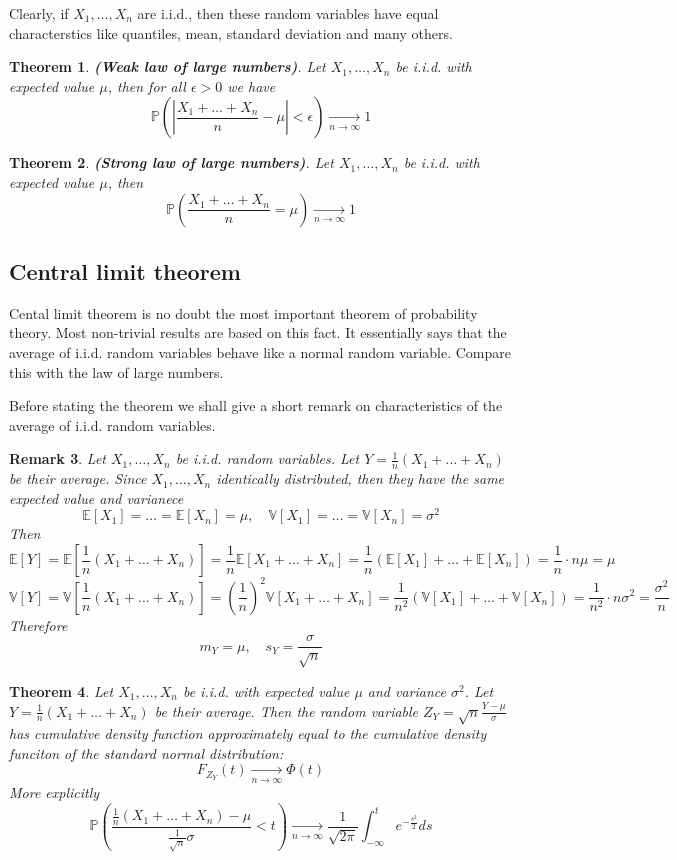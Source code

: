 \documentclass[12pt]{article}
\newtheorem{theorem}{Theorem}[subsection]
\newtheorem{remark}[theorem]{Remark}
\begin{document}
Clearly, if $X_1,\ldots,X_n$ are i.i.d., then these random variables have equal characterstics like quantiles, mean, standard deviation and many others.

\begin{theorem} \textbf{(Weak law of large numbers)}. Let $X_1,\ldots,X_n$ be i.i.d. with expected value $\mu$, then for all $\epsilon>0$ we have
$$
\mathbb{P}\left(\left|\frac{X_1+\ldots+X_n}{n}-\mu\right|<\epsilon\right)\underset{n\to\infty}{\to}1
$$
\end{theorem}

\begin{theorem} \textbf{(Strong law of large numbers)}. Let $X_1,\ldots,X_n$ be i.i.d. with expected value $\mu$, then
$$
\mathbb{P}\left(\frac{X_1+\ldots+X_n}{n}=\mu\right)\underset{n\to\infty}{\to}1
$$
\end{theorem}

\subsection{Central limit theorem}

Cental limit theorem is no doubt the most important theorem of probability theory. Most non-trivial results are based on this fact. It essentially says that the average of i.i.d. random variables behave like a normal random variable. Compare this with the law of large numbers.

Before stating the theorem we shall give a short remark on characteristics of the average of i.i.d. random variables.

\begin{remark} Let $X_1,\ldots,X_n$ be i.i.d. random variables. Let $Y=\frac{1}{n}(X_1+\ldots+X_n)$ be their average. 
Since $X_1,\ldots,X_n$ identically distributed, then they have the same expected value and varianece
$$
\mathbb{E}[X_1]=\ldots=\mathbb{E}[X_n]=\mu, \quad \mathbb{V}[X_1]=\ldots=\mathbb{V}[X_n]=\sigma^2
$$
Then
$$
\mathbb{E}[Y]
=\mathbb{E}\left[\frac{1}{n}(X_1+\ldots+X_n)\right]
=\frac{1}{n}\mathbb{E}[X_1+\ldots+X_n]
=\frac{1}{n}(\mathbb{E}[X_1]+\ldots+\mathbb{E}[X_n])
=\frac{1}{n}\cdot n\mu
=\mu
$$
$$
\mathbb{V}[Y]
=\mathbb{V}\left[\frac{1}{n}(X_1+\ldots+X_n)\right]
=\left(\frac{1}{n}\right)^2\mathbb{V}[X_1+\ldots+X_n]
=\frac{1}{n^2}(\mathbb{V}[X_1]+\ldots+\mathbb{V}[X_n])
=\frac{1}{n^2}\cdot n\sigma^2
=\frac{\sigma^2}{n}
$$
Therefore
$$
m_Y=\mu, \quad s_Y=\frac{\sigma}{\sqrt{n}}
$$
\end{remark}

\begin{theorem} Let $X_1,\ldots,X_n$ be i.i.d. with expected value $\mu$ and variance $\sigma^2$. Let $Y=\frac{1}{n}(X_1+\ldots+X_n)$ be their average. Then the random variable $Z_Y=\sqrt{n}\frac{Y-\mu}{\sigma}$ has cumulative density function approximately equal to the cumulative density funciton of the standard normal distribution:
$$
F_{Z_Y}(t)\underset{n\to\infty}{\to}\Phi(t)
$$
More explicitly
$$
\mathbb{P}\left(\frac{\frac{1}{n}(X_1+\ldots+X_n)-\mu}{\frac{1}{\sqrt{n}}\sigma}<t\right)\underset{n\to\infty}{\to}\frac{1}{\sqrt{2\pi}}\int_{-\infty}^te^{-\frac{s^2}{2}}ds
$$
\end{theorem}
\end{document}
